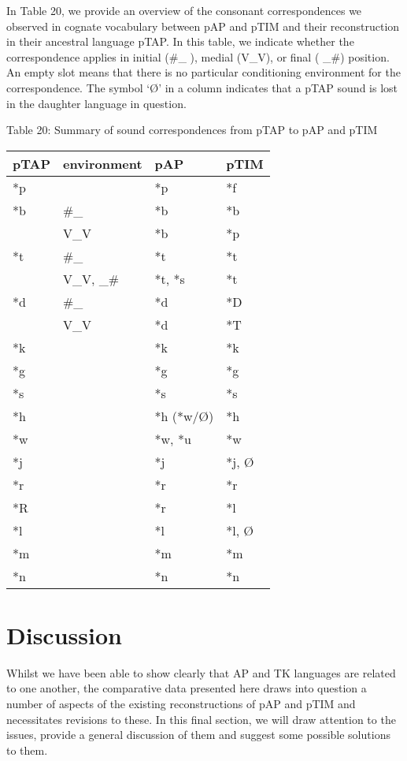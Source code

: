\documentclass[a4paper]{article}
\begin{document}
In Table 20, we provide an overview of the consonant correspondences we observed in cognate vocabulary between pAP and pTIM and their reconstruction in their ancestral language pTAP. In this table, we indicate whether the correspondence applies in initial (\#\_ ), medial (V\_V), or final ( \_\#) position. An empty slot means that there is no particular conditioning environment for the correspondence. The symbol {\textquoteleft}{\O}{\textquoteright} in a column indicates that a pTAP sound is lost in the daughter language in question. 

{\centering
Table 20: Summary of sound correspondences from pTAP to pAP and pTIM
\par}

\begin{center}
\tablehead{}
\begin{supertabular}{m{0.9240598in}m{0.9247598in}m{0.9247598in}m{0.9240598in}}
\hline
pTAP &
environment &
pAP &
pTIM\\\hline
*p &
 &
*p &
*f\\
*b &
\#\_ &
*b &
*b\\
 &
V\_V &
*b &
*p\\
*t &
\#\_ &
*t &
*t\\
 &
V\_V, \_\# &
*t, *s &
*t\\
*d &
\#\_ &
*d &
*D\\
 &
V\_V &
*d &
*T\\
*k &
 &
*k &
*k\\
*g &
 &
*g &
*g\\
*s &
 &
*s &
*s\\
*h &
 &
*h (*w/{\O}) &
*h\\
*w &
 &
*w, *u &
*w\\
*j &
 &
*j &
*j, {\O}\\
*r &
 &
*r &
*r\\
*R &
 &
*r &
*l\\
*l &
 &
*l &
*l, {\O}\\
*m &
 &
*m &
*m\\
*n &
 &
*n &
*n\\\hline
\end{supertabular}
\end{center}
\section[Discussion]{Discussion}
Whilst we have been able to show clearly that AP and TK languages are related to one another, the comparative data presented here draws into question a number of aspects of the existing reconstructions of pAP and pTIM and necessitates revisions to these. In this final section, we will draw attention to the issues, provide a general discussion of them and suggest some possible solutions to them. 
\end{document}
